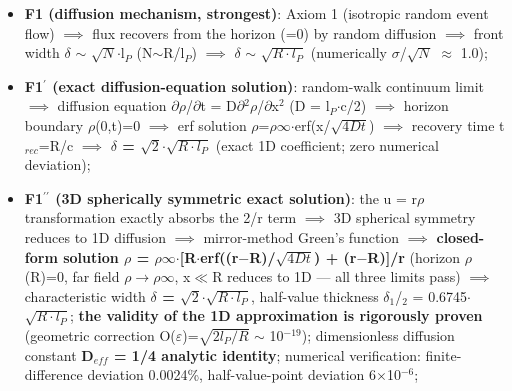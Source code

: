 \documentclass[12pt]{article}
\newcommand{\up}[1]{\ensuremath{^{#1}}}
\newcommand{\down}[1]{\ensuremath{_{#1}}}
\begin{document}
\begin{itemize}
\item \textbf{F1 (diffusion mechanism, strongest)}: Axiom 1 (isotropic random event flow) \ensuremath{\implies} flux recovers from the horizon (=0) by random diffusion \ensuremath{\implies} front width \ensuremath{\delta} \ensuremath{\sim} \ensuremath{\sqrt{N}}\ensuremath{\cdot}l\down{P} (N\ensuremath{\sim}R/l\down{P}) \ensuremath{\implies} \ensuremath{\delta} \ensuremath{\sim} \ensuremath{\sqrt{R\cdot{}l\down{P}}} (numerically \ensuremath{\sigma}/\ensuremath{\sqrt{N}} \ensuremath{\approx} 1.0);
\item \textbf{F1\ensuremath{^\prime} (exact diffusion-equation solution)}: random-walk continuum limit \ensuremath{\implies} diffusion equation \ensuremath{\partial}\ensuremath{\rho}/\ensuremath{\partial}t = D\ensuremath{\partial}\up{2}\ensuremath{\rho}/\ensuremath{\partial}x\up{2} (D = l\down{P}\ensuremath{\cdot}c/2) \ensuremath{\implies} horizon boundary \ensuremath{\rho}(0,t)=0 \ensuremath{\implies} erf solution \ensuremath{\rho}=\ensuremath{\rho}\ensuremath{\infty}\ensuremath{\cdot}erf(x/\ensuremath{\sqrt{4Dt}}) \ensuremath{\implies} recovery time t\down{rec}=R/c \ensuremath{\implies} \textbf{\ensuremath{\delta} = \ensuremath{\sqrt{2}}\ensuremath{\cdot}\ensuremath{\sqrt{R\cdot{}l\down{P}}}} (exact 1D coefficient; zero numerical deviation);
\item \textbf{F1\ensuremath{^{\prime\prime}} (3D spherically symmetric exact solution)}: the u = r\ensuremath{\rho} transformation exactly absorbs the 2/r term \ensuremath{\implies} 3D spherical symmetry reduces to 1D diffusion \ensuremath{\implies} mirror-method Green's function \ensuremath{\implies} \textbf{closed-form solution \ensuremath{\rho} = \ensuremath{\rho}\ensuremath{\infty}\ensuremath{\cdot}[R\ensuremath{\cdot}erf((r\ensuremath{-}R)/\ensuremath{\sqrt{4Dt}}) + (r\ensuremath{-}R)]/r} (horizon \ensuremath{\rho}(R)=0, far field \ensuremath{\rho}\ensuremath{\to}\ensuremath{\rho}\ensuremath{\infty}, x\ensuremath{\ll}R reduces to 1D --- all three limits pass) \ensuremath{\implies} characteristic width \textbf{\ensuremath{\delta} = \ensuremath{\sqrt{2}}\ensuremath{\cdot}\ensuremath{\sqrt{R\cdot{}l\down{P}}}}, half-value thickness \ensuremath{\delta}\down{1}/\down{2} = 0.6745\ensuremath{\cdot}\ensuremath{\sqrt{R\cdot{}l\down{P}}}; \textbf{the validity of the 1D approximation is rigorously proven} (geometric correction O(\ensuremath{\varepsilon})=\ensuremath{\sqrt{2l\down{P}/R}} \ensuremath{\sim} 10\up{-19}); dimensionless diffusion constant \textbf{D\down{eff} = 1/4 analytic identity}; numerical verification: finite-difference deviation 0.0024\%, half-value-point deviation 6\ensuremath{\times}10\up{-6};

\end{itemize}
\end{document}
